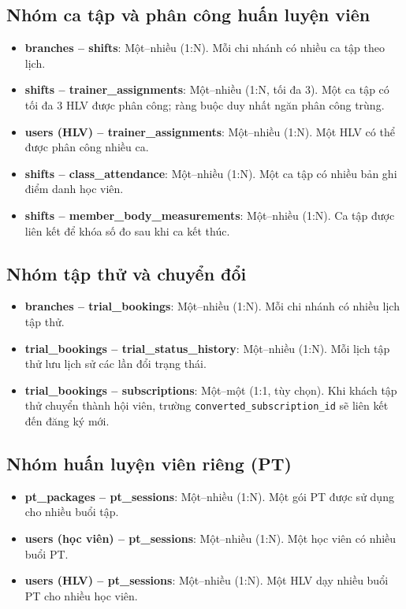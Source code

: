 \subsection*{Nhóm ca tập và phân công huấn luyện viên}
\begin{itemize}
    \item \textbf{branches – shifts}: Một–nhiều (1:N). Mỗi chi nhánh có nhiều ca tập theo lịch.
    \item \textbf{shifts – trainer\_assignments}: Một–nhiều (1:N, tối đa 3). Một ca tập có tối đa 3 HLV được phân công; ràng buộc duy nhất ngăn phân công trùng.
    \item \textbf{users (HLV) – trainer\_assignments}: Một–nhiều (1:N). Một HLV có thể được phân công nhiều ca.
    \item \textbf{shifts – class\_attendance}: Một–nhiều (1:N). Một ca tập có nhiều bản ghi điểm danh học viên.
    \item \textbf{shifts – member\_body\_measurements}: Một–nhiều (1:N). Ca tập được liên kết để khóa số đo sau khi ca kết thúc.
\end{itemize}

\subsection*{Nhóm tập thử và chuyển đổi}
\begin{itemize}
    \item \textbf{branches – trial\_bookings}: Một–nhiều (1:N). Mỗi chi nhánh có nhiều lịch tập thử.
    \item \textbf{trial\_bookings – trial\_status\_history}: Một–nhiều (1:N). Mỗi lịch tập thử lưu lịch sử các lần đổi trạng thái.
    \item \textbf{trial\_bookings – subscriptions}: Một–một (1:1, tùy chọn). Khi khách tập thử chuyển thành hội viên, trường \texttt{converted\_subscription\_id} sẽ liên kết đến đăng ký mới.
\end{itemize}

\subsection*{Nhóm huấn luyện viên riêng (PT)}
\begin{itemize}
    \item \textbf{pt\_packages – pt\_sessions}: Một–nhiều (1:N). Một gói PT được sử dụng cho nhiều buổi tập.
    \item \textbf{users (học viên) – pt\_sessions}: Một–nhiều (1:N). Một học viên có nhiều buổi PT.
    \item \textbf{users (HLV) – pt\_sessions}: Một–nhiều (1:N). Một HLV dạy nhiều buổi PT cho nhiều học viên.
\end{itemize}

